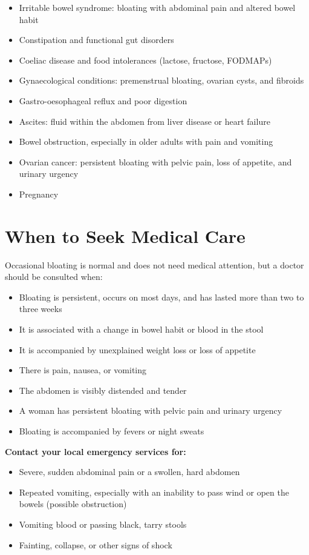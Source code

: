 \begin{itemize}
    \item Irritable bowel syndrome: bloating with abdominal pain and altered bowel habit
    \item Constipation and functional gut disorders
    \item Coeliac disease and food intolerances (lactose, fructose, FODMAPs)
    \item Gynaecological conditions: premenstrual bloating, ovarian cysts, and fibroids
    \item Gastro-oesophageal reflux and poor digestion
    \item Ascites: fluid within the abdomen from liver disease or heart failure
    \item Bowel obstruction, especially in older adults with pain and vomiting
    \item Ovarian cancer: persistent bloating with pelvic pain, loss of appetite, and urinary urgency
    \item Pregnancy
\end{itemize}

\section*{When to Seek Medical Care}
Occasional bloating is normal and does not need medical attention, but a doctor should be consulted when:

\begin{itemize}
    \item Bloating is persistent, occurs on most days, and has lasted more than two to three weeks
    \item It is associated with a change in bowel habit or blood in the stool
    \item It is accompanied by unexplained weight loss or loss of appetite
    \item There is pain, nausea, or vomiting
    \item The abdomen is visibly distended and tender
    \item A woman has persistent bloating with pelvic pain and urinary urgency
    \item Bloating is accompanied by fevers or night sweats
\end{itemize}

\textbf{Contact your local emergency services for:}
\begin{itemize}
    \item Severe, sudden abdominal pain or a swollen, hard abdomen
    \item Repeated vomiting, especially with an inability to pass wind or open the bowels (possible obstruction)
    \item Vomiting blood or passing black, tarry stools
    \item Fainting, collapse, or other signs of shock
\end{itemize}

